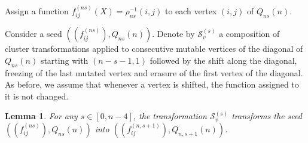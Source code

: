 \documentclass{amsart}
\newtheorem{lemma}[theorem]{Lemma}
\theoremstyle{definition}
\theoremstyle{remark}
\numberwithin{equation}{section}
\numberwithin{theorem}{section}
\begin{document}
Assign a function $f^{(ns)}_{ij}(X)=\rho_{ns}^{-1}(i,j)$
to each vertex $(i,j)$ of $Q_{ns}(n)$.

Consider a seed $((f^{(ns)}_{ij}), Q_{ns}(n) )$. Denote by $\mathcal S_v^{(s)}$ a
composition
of cluster transformations applied to consecutive mutable vertices of the diagonal
of $Q_{ns}(n)$ starting with $(n-s-1, 1)$ followed by the shift along the diagonal,
freezing of the last mutated vertex and erasure of the first vertex of the diagonal.
As before, we assume that whenever a vertex is shifted, the function assigned to it is not changed.

\begin{lemma}
\label{Sv}
For any $s\in [0,n-4]$, the transformation $\mathcal S_v^{(s)}$ transforms the seed $((f_{ij}^{(ns)}), Q_{ns}(n) )$ into
 $((f_{ij}^{(n, s+1)}), Q_{n, s+1}(n) )$.
\end{lemma}
\end{document}
